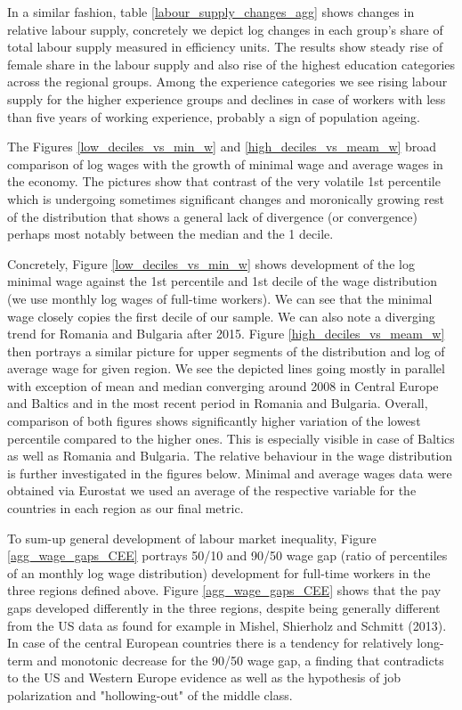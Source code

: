 \documentclass{article}
\begin{document}
In a similar fashion, table \ref{labour_supply_changes_agg} shows changes in relative labour supply, concretely we depict log changes in each group's share of total labour supply measured in efficiency units. The results show steady rise of female share in the labour supply and also rise of the highest education categories across the regional groups. Among the experience categories we see rising labour supply for the higher experience groups and declines in case of workers with less than five years of working experience, probably a sign of population ageing.

The Figures \ref{low_deciles_vs_min_w} and \ref{high_deciles_vs_meam_w} broad comparison of log wages with the growth of minimal wage and average wages in the economy. The pictures show that contrast of the very volatile 1st percentile which is undergoing sometimes significant changes and moronically growing rest of the distribution that shows a general lack of divergence (or convergence) perhaps most notably between the median and the 1 decile.

Concretely, Figure \ref{low_deciles_vs_min_w} shows development of the log minimal wage against the 1st percentile and 1st decile of the wage distribution (we use monthly log wages of full-time workers). We can see that the minimal wage closely copies the first decile of our sample. We can also note a diverging trend for Romania and Bulgaria after 2015. Figure \ref{high_deciles_vs_meam_w} then portrays a similar picture for upper segments of the distribution and log of average wage for given region. We see the depicted lines going mostly in parallel with exception of mean and median converging around 2008 in Central Europe and Baltics and in the most recent period in Romania and Bulgaria. 
Overall, comparison of both figures shows significantly higher variation of the lowest percentile compared to the higher ones. This is especially visible in case of Baltics as well as Romania and Bulgaria. The relative behaviour in the wage distribution is further investigated in the figures below. Minimal and average wages data were obtained via Eurostat we used an average of the respective variable for the countries in each region as our final metric.

To sum-up general development of labour market inequality, Figure \ref{agg_wage_gaps_CEE} portrays 50/10 and 90/50 wage gap (ratio of percentiles of an monthly log wage distribution) development for full-time workers in the three regions defined above.
Figure \ref{agg_wage_gaps_CEE} shows that the pay gaps developed differently in the three regions, despite being generally different from the US data as found for example in Mishel, Shierholz and Schmitt (2013). In case of the central European countries there is a tendency for relatively long-term and monotonic decrease for the 90/50 wage gap, a finding that contradicts to the US and Western Europe evidence as well as the hypothesis of job polarization and "hollowing-out" of the middle class.
\end{document}
